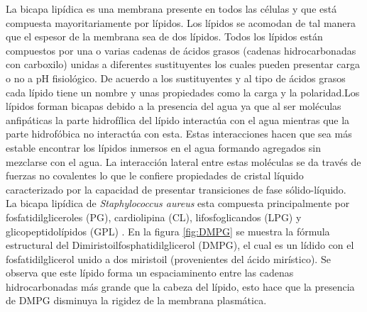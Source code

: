 \documentclass[12pt]{article}
\begin{document}
La bicapa lipídica es una membrana presente en todos las células y  que está compuesta mayoritariamente por lípidos. Los lípidos se acomodan de tal manera que el espesor de la membrana sea de dos lípidos. Todos los lípidos están compuestos por una o varias cadenas de ácidos grasos (cadenas hidrocarbonadas con carboxilo) unidas a diferentes sustituyentes los cuales pueden presentar carga o no a pH fisiológico. De acuerdo a los sustituyentes y al tipo de ácidos grasos cada lípido tiene un  nombre y unas propiedades como la carga y la polaridad.Los lípidos forman bicapas debido a la presencia del agua ya que al ser moléculas anfipáticas la parte hidrofílica del lípido interactúa con el agua mientras que la parte hidrofóbica no interactúa con esta. Estas interacciones hacen que sea más estable encontrar los lípidos inmersos en el agua formando agregados sin mezclarse con el agua. La interacci\'on lateral entre estas mol\'eculas se da trav\'es de fuerzas no covalentes lo que le confiere propiedades de cristal l\'iquido caracterizado por la capacidad de presentar transiciones de fase s\'olido-l\'iquido. \\

La bicapa lipídica de \textit{Staphylococcus aureus} esta compuesta principalmente por fosfatidilgliceroles (PG), cardiolipina (CL), lifosfoglicandos (LPG) y glicopeptidolípidos (GPL) \cite{Sohlenkamp2015BacterialPathways}. En la figura \ref{fig:DMPG} se muestra la fórmula estructural del Dimiristoilfosphatidilglicerol (DMPG), el cual es un lídido con el fosfatidilglicerol unido a dos miristoil (provenientes del ácido mirístico). Se observa que este lípido forma un espaciaminento entre las cadenas hidrocarbonadas más grande que la cabeza del lípido, esto hace que la presencia de DMPG disminuya la rigidez de la membrana plasmática.
\\
\end{document}
